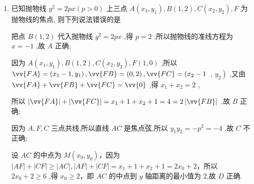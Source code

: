 \begin{enumerate}
    \item 已知抛物线 ${y}^{2} = {2px}\left( {p > 0}\right)$ 上三点 $A\left( {{x}_{1},{y}_{1}}\right) ,B\left( {1,2}\right) ,C\left( {{x}_{2},{y}_{2}}\right) ,F$ 为抛物线的焦点, 则下列说法错误的是
    \begin{jieda}
        把点 $B\left( {1,2}\right)$ 代入抛物线 ${y}^{2} = {2px}$ ,得 $p = 2$ ,所以抛物线的准线方程为 $x =  - 1$ ,故 ${A}$ 正确;
        
        因为 $A\left( {{x}_{1},{y}_{1}}\right) ,B\left( {1,2}\right) ,C\left( {{x}_{2},{y}_{2}}\right) ,F\left( {1,0}\right)$ ,所以 $\vv{FA} = \left( {{x}_{1} - 1,{y}_{1}}\right) ,\vv{FB} = \left( {0,2}\right) ,\vv{FC} = \left( {{x}_{2} - 1}\right.$ , $\left. {y}_{2}\right)$ ,又由 $\vv{FA} + \vv{FB} + \vv{FC} = \vv{0}$ ,得 ${x}_{1} + {x}_{2} = 2$ ,
        
        所以 $\left| \vv{FA}\right|  + \left| \vv{FC}\right|  = {x}_{1} + 1 + {x}_{2} + 1 = 4 = 2\left| \vv{FB}\right|$ ,故 ${B}$ 正确;
        
        因为 $A,F,C$ 三点共线,所以直线 ${AC}$ 是焦点弦,所以 ${y}_{1}{y}_{2} =  - {p}^{2} =  - 4$ ,故 ${C}$ 不正确; 
        
        
        设 ${AC}$ 的中点为 $M\left( {{x}_{0},{y}_{0}}\right)$，因为 $\left| {AF}\right|  + \left| {CF}\right|  \geq  \left| {AC}\right| ,\left| {AF}\right|  + \left| {CF}\right|  = {x}_{1} + 1 + {x}_{2} + 1 = 2{x}_{0} + 2$，所以 $2{x}_{0} + 2 \geq  6$ ,得 ${x}_{0} \geq  2$，即 ${AC}$ 的中点到 $y$ 轴距离的最小值为 2,故 ${D}$ 正确.
    \end{jieda}


\end{enumerate}
